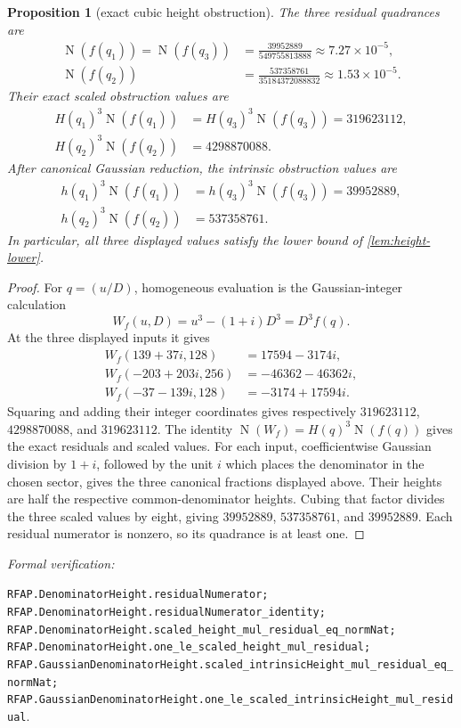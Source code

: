 \documentclass[11pt]{article}
\newtheorem{proposition}[proposition]{Proposition}
\newcommand{\Norm}[1]{\operatorname{N}\!\left(#1\right)}
\newcommand{\leanref}[1]{\par\smallskip\noindent
  \emph{Formal verification:}\par\nobreak
  {\raggedright\nolinkurl{#1}.\par}}
\begin{document}
\begin{proposition}[exact cubic height obstruction]
\label{prop:cubic-obstruction}
The three residual quadrances are
\begin{align*}
 \Norm{f(q_1)}=\Norm{f(q_3)}
   &=\frac{39952889}{549755813888}
     \approx 7.27\mathbin{\times}10^{-5},\\
 \Norm{f(q_2)}
   &=\frac{537358761}{35184372088832}
     \approx 1.53\mathbin{\times}10^{-5}.
\end{align*}
Their exact scaled obstruction values are
\[
 \begin{aligned}
 H(q_1)^3\Norm{f(q_1)}
   &=H(q_3)^3\Norm{f(q_3)}=319623112,\\
 H(q_2)^3\Norm{f(q_2)}&=4298870088.
 \end{aligned}
\]
After canonical Gaussian reduction, the intrinsic obstruction values are
\[
 \begin{aligned}
 h(q_1)^3\Norm{f(q_1)}
   &=h(q_3)^3\Norm{f(q_3)}=39952889,\\
 h(q_2)^3\Norm{f(q_2)}&=537358761.
 \end{aligned}
\]
In particular, all three displayed values satisfy the lower bound of
\cref{lem:height-lower}.
\end{proposition}

\begin{proof}
For $q=(u/D)$, homogeneous evaluation is the Gaussian-integer calculation
\[
             W_f(u,D)=u^3-(1+i)D^3=D^3f(q).
\]
At the three displayed inputs it gives
\[
 \begin{aligned}
 W_f(139+37i,128)&=17594-3174i,\\
 W_f(-203+203i,256)&=-46362-46362i,\\
 W_f(-37-139i,128)&=-3174+17594i.
 \end{aligned}
\]
Squaring and adding their integer coordinates gives respectively
$319623112$, $4298870088$, and $319623112$.  The identity
$\Norm{W_f}=H(q)^3\Norm{f(q)}$ gives the exact residuals and scaled values.
For each input, coefficientwise Gaussian division by $1+i$, followed by the
unit $i$ which places the denominator in the chosen sector, gives the three
canonical fractions displayed above.  Their heights are half the respective
common-denominator heights.  Cubing that factor divides the three scaled
values by eight, giving $39952889$, $537358761$, and $39952889$.
Each residual numerator is nonzero, so its quadrance is at least one.
\end{proof}

\leanref{RFAP.DenominatorHeight.residualNumerator;
RFAP.DenominatorHeight.residualNumerator_identity;
RFAP.DenominatorHeight.scaled_height_mul_residual_eq_normNat;
RFAP.DenominatorHeight.one_le_scaled_height_mul_residual;
RFAP.GaussianDenominatorHeight.scaled_intrinsicHeight_mul_residual_eq_normNat;
RFAP.GaussianDenominatorHeight.one_le_scaled_intrinsicHeight_mul_residual}
\end{document}
